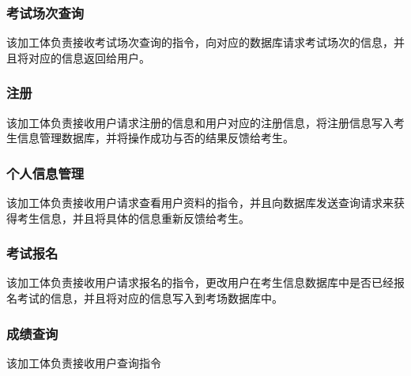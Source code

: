 \subsubsection{考试场次查询}
该加工体负责接收考试场次查询的指令，向对应的数据库请求考试场次的信息，并且将对应的信息返回给用户。

\subsubsection{注册}
该加工体负责接收用户请求注册的信息和用户对应的注册信息，将注册信息写入考生信息管理数据库，并将操作成功与否的结果反馈给考生。

\subsubsection{个人信息管理}
该加工体负责接收用户请求查看用户资料的指令，并且向数据库发送查询请求来获得考生信息，并且将具体的信息重新反馈给考生。

\subsubsection{考试报名}
该加工体负责接收用户请求报名的指令，更改用户在考生信息数据库中是否已经报名考试的信息，并且将对应的信息写入到考场数据库中。

\subsubsection{成绩查询}
该加工体负责接收用户查询指令

